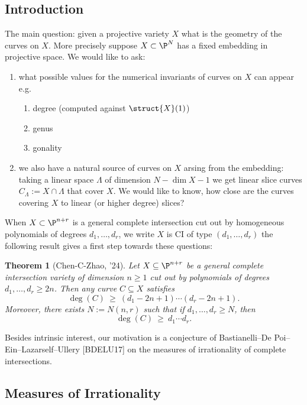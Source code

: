 \documentclass[12pt]{article}
\theoremstyle{plain}
\newtheorem{Lthm}{Theorem}
\begin{document}
\subsection{Introduction}

The main question: given a projective variety $X$ what is the geometry of the curves on $X$. More precisely suppose $X \subset \P^N$ has a fixed embedding in projective space. We would like to ask:
\begin{enumerate}
\item what possible values for the numerical invariants of curves on $X$ can appear e.g.
\begin{enumerate}
\item degree (computed against $\struct{X}(1)$)
\item genus 
\item gonality
\end{enumerate}
\item we also have a natural source of curves on $X$ arsing from the embedding: taking a linear space $\Lambda$ of dimension $N - \dim{X}-1$ we get linear slice curves $C_\Lambda := X \cap \Lambda$ that cover $X$. We would like to know, how close are the curves covering $X$ to linear (or higher degree) slices? 
\end{enumerate}
When $X \subset \P^{n+r}$ is a general complete intersection cut out by homogeneous polynomials of degrees $d_1, \dots, d_r$, we write $X$ is CI of type $(d_1, \dots, d_r)$ the following result gives a first step towards these questions:

\begin{Lthm}[Chen-C-Zhao, '24]
Let $X \subseteq \P^{n+r}$ be a general complete intersection variety of dimension $n \geq 1$ cut out by polynomials of degrees $d_{1}, \ldots, d_{r} \geq 2n$. Then any curve $C \subseteq X$ satisfies
\[ \deg(C)\ \ge\ (d_1 - 2n + 1) \cdots (d_r - 2n + 1) .\]
Moreover, there exists $N := N(n,r)$ such that if $d_1, \dots, d_r \ge N$, then
\[ \deg(C)\ \ge\ d_1 \cdots d_r. \]
\end{Lthm}

{\color{red} Besides intrinsic interest, our motivation is a conjecture of Bastianelli--De Poi--Ein--Lazarself--Ullery [BDELU17] on the measures of irrationality of complete intersections.}

\subsection{Measures of Irrationality}
\end{document}
